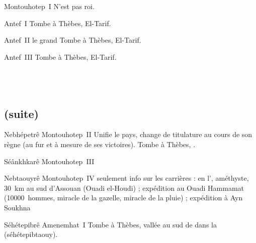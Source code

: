 \noindent{}

\begin{listerois}
  \item [Montouhotep~I] N'est pas roi.
  \item [Antef~I] Tombe à Thèbes, El-Tarif.
  \item [Antef~II le grand] Tombe à Thèbes, El-Tarif. \\
  \item [Antef~III] Tombe à Thèbes, El-Tarif.
\end{listerois}

\section{\MK}

\noindent{} \\


\subsection{\texorpdfstring{}{XIe dynastie} (suite)}

\begin{listerois}
  \item [Nebhépetrê Montouhotep~II] Unifie le pays, change 
        de titulature au cours de son règne (au fur et à mesure de ses 
        victoires). Tombe à Thèbes, \DeB.
  \item [Séânkhkarê Montouhotep~III]
  \item [Nebtaouyrê Montouhotep~IV] seulement info sur les carrières : 
        en l', améthyste, \SI{30}{\km} au sud d'Assouan (Ouadi 
        el-Houdi) ; 
        expédition au Ouadi Hammamat (\num{10000}~hommes, miracle de 
        la gazelle, miracle de la pluie) ;
        expédition à Ayn Soukhna
  \item [Séhétepibrê Amenemhat~I] Tombe à Thèbes, vallée au sud 
        de \DeB dans la 
        (séhétepibtaouy).
\end{listerois}

\subsection{\texorpdfstring{}{XIIe dynastie}}

